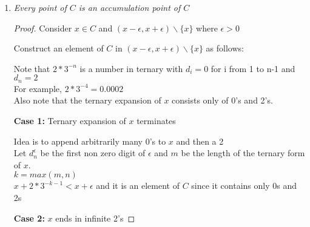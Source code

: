 \documentclass[12pt, a4paper]{article}
\begin{document}
\begin{enumerate}
\begin{proof}
                    Then $x=0.1d_2d_3\mathellipsis$
                    
                    Removing this middle third means we have now removed all $x$ where $x$ has a $d_1 = 1$
                    
                    Meaning $x\in C_1 = [0,1]\backslash (1,3) \implies x=0.0d_2d_3d_4\mathellipsis$ or $x=0.2d_2d_3d_4\mathellipsis$

                    Now consider $x \in (1/9, 2/9)$. $x=0.01d_3d_4\mathellipsis$

                    Simiilarly,  $x \in (5/9, 8/9)$ has the form $x=0.21d_3d_4\mathellipsis$

                    Removing these two open intervals removes all x where x has the form $0.d_11d_3d_4\mathellipsis$

                    Continuing inductively, on the nth step we remove all x where $d_n=1$.


                \end{proof}
            \item \textit{Every point of $C$ is an accumulation point of $C$}
                \begin{proof}
                    Consider $x\in C$ and $(x-\epsilon, x+\epsilon)\backslash\{x\}$ where $\epsilon > 0$

                    Construct an element of $C$ in $(x-\epsilon, x+\epsilon)\backslash\{x\}$ as follows:

                    Note that $2*3^{-n}$ is a number in ternary with $d_i = 0$ for i from 1 to n-1 and $d_{n}=2$\\
                    For example, $2*3^{-4} = 0.0002$\\
                    Also note that the ternary expansion of $x$ consists only of 0's and 2's. 


                    \textbf{Case 1:} Ternary expansion of $x$ terminates

                    Idea is to append arbitrarily many 0's to $x$ and then a 2\\
                    Let $d_n^\epsilon$ be the first non zero digit of $\epsilon$ and $m$ be the length of the ternary form of $x$.\\
                    $k = max(m,n)$\\
                    $x + 2*3^{-k-1}< x+\epsilon$ and it is an element of $C$ since it contains only 0s and 2s

                    \textbf{Case 2:} $x$ ends in infinite 2's


\end{proof}
\end{enumerate}
\end{document}
